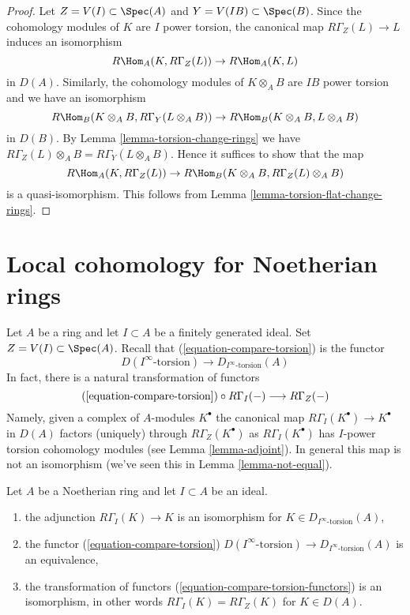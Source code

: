 \begin{proof}
Let $Z = V(I) \subset \Spec(A)$ and $Y = V(IB) \subset \Spec(B)$.
Since the cohomology modules of $K$ are $I$ power torsion, the
canonical map $R\Gamma_Z(L) \to L$ induces an isomorphism
$$
R\Hom_A(K, R\Gamma_Z(L)) \to R\Hom_A(K, L)
$$
in $D(A)$. Similarly, the cohomology modules of $K \otimes_A B$ are
$IB$ power torsion and we have an isomorphism
$$
R\Hom_B(K \otimes_A B, R\Gamma_Y(L \otimes_A B)) \to 
R\Hom_B(K \otimes_A B, L \otimes_A B)
$$
in $D(B)$.
By Lemma \ref{lemma-torsion-change-rings} we have
$R\Gamma_Z(L) \otimes_A B = R\Gamma_Y(L \otimes_A B)$.
Hence it suffices to show that the map
$$
R\Hom_A(K, R\Gamma_Z(L)) \to R\Hom_B(K \otimes_A B, R\Gamma_Z(L) \otimes_A B)
$$
is a quasi-isomorphism. This follows from
Lemma \ref{lemma-torsion-flat-change-rings}.
\end{proof}




\section{Local cohomology for Noetherian rings}
\label{section-local-cohomology-noetherian}

\noindent
Let $A$ be a ring and let $I \subset A$ be a finitely generated ideal.
Set $Z = V(I) \subset \Spec(A)$. Recall that (\ref{equation-compare-torsion})
is the functor
$$
D(I^\infty\text{-torsion}) \to D_{I^\infty\text{-torsion}}(A)
$$
In fact, there is a natural transformation of functors
\begin{equation}
\label{equation-compare-torsion-functors}
(\ref{equation-compare-torsion}) \circ R\Gamma_I(-)
\longrightarrow
R\Gamma_Z(-)
\end{equation}
Namely, given a complex of $A$-modules $K^\bullet$ the canonical map
$R\Gamma_I(K^\bullet) \to K^\bullet$ in $D(A)$ factors (uniquely)
through $R\Gamma_Z(K^\bullet)$ as $R\Gamma_I(K^\bullet)$ has
$I$-power torsion cohomology modules (see Lemma \ref{lemma-adjoint}).
In general this map is not an isomorphism (we've seen this in
Lemma \ref{lemma-not-equal}).

\begin{lemma}
\label{lemma-local-cohomology-noetherian}
Let $A$ be a Noetherian ring and let $I \subset A$ be an ideal.
\begin{enumerate}
\item the adjunction $R\Gamma_I(K) \to K$ is an isomorphism
for $K \in D_{I^\infty\text{-torsion}}(A)$,
\item the functor
(\ref{equation-compare-torsion})
$D(I^\infty\text{-torsion}) \to D_{I^\infty\text{-torsion}}(A)$
is an equivalence,
\item the transformation of functors
(\ref{equation-compare-torsion-functors}) is an isomorphism,
in other words $R\Gamma_I(K) = R\Gamma_Z(K)$ for $K \in D(A)$.
\end{enumerate}
\end{lemma}

